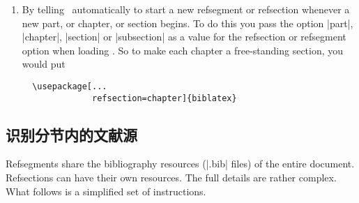 \begin{enumerate}
\begin{marginfigure}
  \end{marginfigure}
  Using the commands |\newrefsection| and |\newrefsegment|. Each of
  these ends the existing refsegment or refsection (if need be) and
  starts a new one. You can mark the end of refsegments or refsections
  with |\endrefsegment| or |\endrefsection|.
\item By telling \biblatex\ automatically to start a new refsegment or
  refsection whenever a new part, or chapter, or section begins. To do
  this you pass the option |part|, |chapter|, |section| or |subsection| as a
  value for the refsection or refsegment option when loading \biblatex.
  So to make each chapter a free-standing section, you would put
  \begin{marginfigure}
  \end{marginfigure}
\begin{Verbatim}
  \usepackage[...
              refsection=chapter]{biblatex}
\end{Verbatim}
\end{enumerate}

\subsection{识别分节内的文献源}

Refsegments share the bibliography resources (|.bib| files) of the
entire document. Refsections can have their own resources. The full
details are rather complex. What follows is a simplified set of
instructions.

